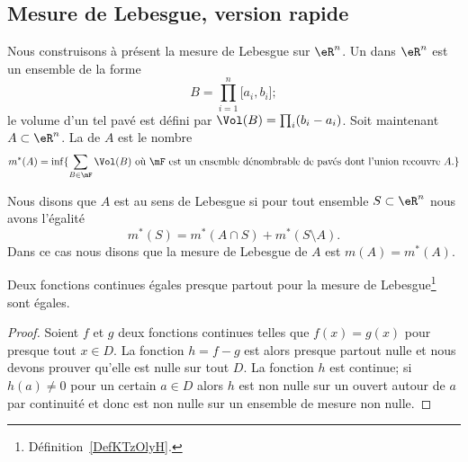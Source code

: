 \subsection{Mesure de Lebesgue, version rapide}

Nous construisons à présent la mesure de Lebesgue sur \( \eR^n\). Un  dans \( \eR^n\) est un ensemble de la forme
\begin{equation}
    B=\prod_{i=1}^n\mathopen[ a_i , b_i \mathclose];
\end{equation}
le volume d'un tel pavé est défini par \( \Vol(B)=\prod_i(b_i-a_i)\). Soit maintenant \( A\subset \eR^n\). La  de \( A\) est le nombre
\begin{equation}
    m^*(A)=\inf\{ \sum_{B\in\mF}\Vol(B)\text{ où } \mF\text{ est un ensemble dénombrable de pavés dont l'union recouvre } A\text{.} \}
\end{equation}

\begin{definition}  \label{DefKTzOlyH}
Nous disons que \( A\) est  au sens de Lebesgue si pour tout ensemble \( S\subset \eR^n\) nous avons l'égalité
\begin{equation}
    m^*(S)=m^*(A\cap S)+m^*(S\setminus A).
\end{equation}
Dans ce cas nous disons que la mesure de Lebesgue de \( A\) est \( m(A)=m^*(A)\).
\end{definition}

\begin{proposition}     \label{PropNCMToWI}
    Deux fonctions continues égales presque partout pour la mesure de Lebesgue\footnote{Définition~\ref{DefKTzOlyH}.} sont égales.
\end{proposition}

\begin{proof}
    Soient \( f\) et \( g\) deux fonctions continues telles que \( f(x)=g(x)\) pour presque tout \( x\in D\). La fonction \( h=f-g\) est alors presque partout nulle et nous devons prouver qu'elle est nulle sur tout \( D\). La fonction \( h\) est continue; si \( h(a)\neq 0\) pour un certain \( a\in D\) alors \( h\) est non nulle sur un ouvert autour de \( a\) par continuité et donc est non nulle sur un ensemble de mesure non nulle.
\end{proof}

